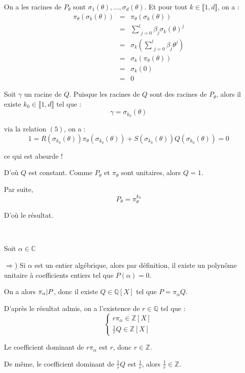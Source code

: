On a les racines de $P_{\theta}$ sont $\sigma_1 (\theta), \ldots, \sigma_d
(\theta)$. Et pour tout $k \in \llbracket 1, d \rrbracket$, on a :
\begin{eqnarray*}
  \pi_{\theta} (\sigma_k (\theta)) & = & \pi_{\theta} (\sigma_k (\theta))\\
  & = & \underset{j = 0}{\overset{l}{\sum}} \beta_j \sigma_k (\theta)^j\\
  & = & \sigma_k \left( \underset{j = 0}{\overset{l}{\sum}} \beta_j \theta^j
  \right)\\
  & = & \sigma_k (\pi_{\theta} (\theta))\\
  & = & \sigma_k (0)\\
  & = & 0
\end{eqnarray*}


Soit $\gamma$ un racine de $Q$. Puisque les racines de $Q$ sont des racines de
$P_{\theta}$, alors il existe $k_0 \in \llbracket 1, d \rrbracket$ tel que :
\[ \gamma = \sigma_{k_0} (\theta) \]


via la relation $(5)$, on a :
\[ 1 = R (\sigma_{k_0} (\theta)) \pi_{\theta} (\sigma_{k_0} (\theta)) + S
   (\sigma_{k_0} (\theta)) Q (\sigma_{k_0} (\theta)) = 0 \]


ce qui est absurde !

D'o{\`u} $Q$ est constant. Comme $P_{\theta}$ et $\pi_{\theta}$ sont
unitaires, alors $Q = 1$.

Par suite,
\[ P_{\theta} = \pi^{k_0}_{\theta} \]


D'o{\`u} le r{\'e}sultat.

\

 Soit $\alpha \in \mathbb{C}$

$\Rightarrow$) Si $\alpha$ est un entier alg{\'e}brique, alors par
d{\'e}finition, il existe un polyn{\^o}me unitaire {\`a} coefficients entiers
tel que $P (\alpha) = 0$.

On a alors $\pi_{\alpha} | P $, donc il existe $Q \in \mathbb{Q}
[X]$ tel que $P = \pi_{\alpha} Q$.

D'apr{\`e}s le r{\'e}sultat admis, on a l'existence de $r \in \mathbb{Q}$ tel
que :
\[ \left\{\begin{array}{l}
     r \pi_{\alpha} \in \mathbb{Z} [X]\\
     \frac{1}{r} Q \in \mathbb{Z} [X]
   \end{array}\right. \]


Le coefficient dominant de $r \pi_{\alpha}$ est $r$, donc $r \in \mathbb{Z}$.

De m{\^e}me, le coefficient dominant de $\frac{1}{r} Q$ est $\frac{1}{r}$,
alors $\frac{1}{r} \in \mathbb{Z}$.

